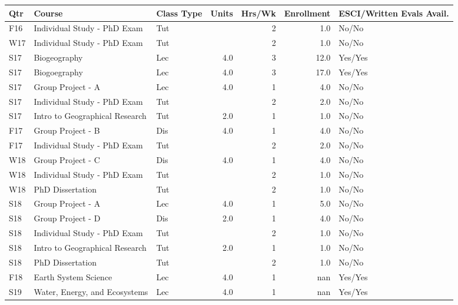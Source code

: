 
\begin{longtable}{lp{6.5cm}p{1cm}rrrp{2cm}}
Qtr & Course & Class Type & Units & Hrs/Wk & Enrollment & ESCI/Written Evals Avail.\\
\hline 
\endhead 
F16 & Individual Study - PhD Exam & Tut &  & 2 & 1.0 & No/No \\ 
W17 & Individual Study - PhD Exam & Tut &  & 2 & 1.0 & No/No \\ 
S17 & Biogeography & Lec & 4.0 & 3 & 12.0 & Yes/Yes \\ 
S17 & Biogoegraphy & Lec & 4.0 & 3 & 17.0 & Yes/Yes \\ 
S17 & Group Project - A & Lec & 4.0 & 1 & 4.0 & No/No \\ 
S17 & Individual Study - PhD Exam & Tut &  & 2 & 2.0 & No/No \\ 
S17 & Intro to Geographical Research & Tut & 2.0 & 1 & 1.0 & No/No \\ 
F17 & Group Project - B & Dis & 4.0 & 1 & 4.0 & No/No \\ 
F17 & Individual Study - PhD Exam & Tut &  & 2 & 2.0 & No/No \\ 
W18 & Group Project - C & Dis & 4.0 & 1 & 4.0 & No/No \\ 
W18 & Individual Study - PhD Exam & Tut &  & 2 & 1.0 & No/No \\ 
W18 & PhD Dissertation & Tut &  & 2 & 1.0 & No/No \\ 
S18 & Group Project - A & Lec & 4.0 & 1 & 5.0 & No/No \\ 
S18 & Group Project - D & Dis & 2.0 & 1 & 4.0 & No/No \\ 
S18 & Individual Study - PhD Exam & Tut &  & 2 & 1.0 & No/No \\ 
S18 & Intro to Geographical Research & Tut & 2.0 & 1 & 1.0 & No/No \\ 
S18 & PhD Dissertation & Tut &  & 2 & 1.0 & No/No \\ 
F18 & Earth System Science & Lec & 4.0 & 1 & nan & Yes/Yes \\ 
S19 & Water, Energy, and Ecosystems & Lec & 4.0 & 1 & nan & Yes/Yes \\ 
 
\end{longtable}

